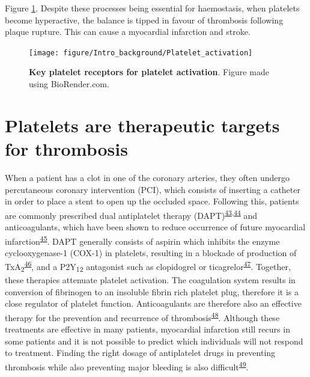 \documentclass[11pt,twoside]{bristolthesis}
\begin{document}
Figure \ref{fig:platelet-activation-receptors}. Despite these processes being essential for haemostasis, when platelets become hyperactive, the balance is tipped in favour of thrombosis following plaque rupture. This can cause a myocardial infarction and stroke.




\begin{figure}

{\centering \texttt{[image: figure/Intro\_background/Platelet\_activation]} 

}

\caption[Key platelet receptors for platelet activation]{\textbf{Key platelet receptors for platelet activation}. Figure made using BioRender.com.}\label{fig:platelet-activation-receptors}
\end{figure}
\hypertarget{platelets-are-therapeutic-targets-for-thrombosis}{%
\section{Platelets are therapeutic targets for thrombosis}\label{platelets-are-therapeutic-targets-for-thrombosis}}

When a patient has a clot in one of the coronary arteries, they often undergo percutaneous coronary intervention (PCI), which consists of inserting a catheter in order to place a stent to open up the occluded space. Following this, patients are commonly prescribed dual antiplatelet therapy (DAPT)\textsuperscript{\protect\hyperlink{ref-Freynhofer2017a}{43},\protect\hyperlink{ref-Nardin2015}{44}} and anticoagulants, which have been shown to reduce occurrence of future myocardial infarction\textsuperscript{\protect\hyperlink{ref-Khan2020}{45}}. DAPT generally consists of aspirin which inhibits the enzyme cyclooxygenase-1 (COX-1) in platelets, resulting in a blockade of production of TxA\textsubscript{2}\textsuperscript{\protect\hyperlink{ref-Warner2011}{46}}, and a P2Y\textsubscript{12} antagonist such as clopidogrel or ticagrelor\textsuperscript{\protect\hyperlink{ref-Degrauwe2017}{47}}. Together, these therapies attenuate platelet activation. The coagulation system results in conversion of fibrinogen to an insoluble fibrin rich platelet plug, therefore it is a close regulator of platelet function. Anticoagulants are therefore also an effective therapy for the prevention and recurrence of thrombosis\textsuperscript{\protect\hyperlink{ref-Grover2019}{48}}. Although these treatments are effective in many patients, myocardial infarction still recurs in some patients and it is not possible to predict which individuals will not respond to treatment. Finding the right dosage of antiplatelet drugs in preventing thrombosis while also preventing major bleeding is also difficult\textsuperscript{\protect\hyperlink{ref-Mullen2021}{49}}.
\end{document}
